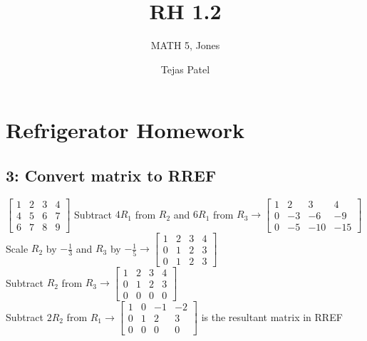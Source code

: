 \documentclass{article}
\title{RH 1.2}
\author{MATH 5, Jones}
\date{Tejas Patel}
\begin{document}
\maketitle
\section{Refrigerator Homework}
\subsection*{3: Convert matrix to RREF}
$
\left[\begin{array}{ccc|c}
    1 & 2 & 3 & 4 \\
    4 & 5 & 6 & 7 \\
    6 & 7 & 8 & 9 
\end{array}\right]
$ Subtract $4R_1$ from $R_2$ and $6R_1$ from $R_3 \rightarrow
\left[\begin{array}{ccc|c}
    1 & 2 & 3 & 4 \\
    0 & -3 & -6 & -9 \\
    0 & -5 & -10 & -15 
\end{array}\right]
$\\[0.1in]Scale $R_2$ by $-\frac{1}{3}$ and $R_3$ by $-\frac{1}{5} \rightarrow 
\left[\begin{array}{ccc|c}
    1 & 2 & 3 & 4 \\
    0 & 1 & 2 & 3 \\
    0 & 1 & 2 & 3 
\end{array}\right]$ \\[0.1in] Subtract $R_2$ from $R_3 \rightarrow
\left[\begin{array}{ccc|c}
    1 & 2 & 3 & 4 \\
    0 & 1 & 2 & 3 \\
    0 & 0 & 0 & 0 
\end{array}\right]$ \\[0.1in] Subtract $2R_2$ from $R_1 \rightarrow
\boxed{\left[\begin{array}{ccc|c}
    1 & 0 & -1 & -2 \\
    0 & 1 & 2 & 3 \\
    0 & 0 & 0 & 0 
\end{array}\right]}
$ is the resultant matrix in RREF
\end{document}
